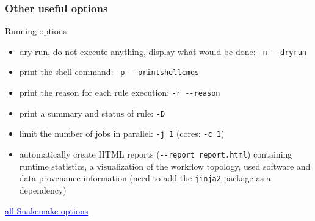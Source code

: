 \begin{frame}[containsverbatim]
\frametitle{Other useful options}
\begin{block}{Running options}
\begin{itemize}
    \item dry-run, do not execute anything, display what would be done: \verb|-n --dryrun|
    \item print the shell command: \verb|-p --printshellcmds |
    \item print the reason for each rule execution: \verb|-r --reason|
    \item print a summary and status of rule: \verb|-D|
    \item limit the number of jobs in parallel: \verb|-j 1| (cores: \verb|-c 1|)
    \item automatically create HTML reports (\verb|--report report.html|) containing runtime statistics, a visualization of the workflow topology, used software and data provenance information (need to add the \verb|jinja2| package as a dependency)
\end{itemize}
\end{block}
\vfill
\href{https://snakemake.readthedocs.io/en/stable/executing/cli.html#all-option}{\textcolor{blue}{\underline{all Snakemake options}}}
\end{frame}



